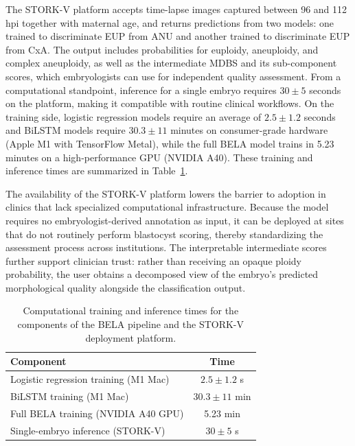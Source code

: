 \documentclass[11pt]{article}
\begin{document}
The STORK-V platform accepts time-lapse images captured between 96 and 112 hpi together with maternal age, and returns predictions from two models: one trained to discriminate EUP from ANU and another trained to discriminate EUP from CxA. The output includes probabilities for euploidy, aneuploidy, and complex aneuploidy, as well as the intermediate MDBS and its sub-component scores, which embryologists can use for independent quality assessment. From a computational standpoint, inference for a single embryo requires $30 \pm 5$ seconds on the platform, making it compatible with routine clinical workflows. On the training side, logistic regression models require an average of $2.5 \pm 1.2$ seconds and BiLSTM models require $30.3 \pm 11$ minutes on consumer-grade hardware (Apple M1 with TensorFlow Metal), while the full BELA model trains in 5.23 minutes on a high-performance GPU (NVIDIA A40). These training and inference times are summarized in Table~\ref{tab:timing}.

The availability of the STORK-V platform lowers the barrier to adoption in clinics that lack specialized computational infrastructure. Because the model requires no embryologist-derived annotation as input, it can be deployed at sites that do not routinely perform blastocyst scoring, thereby standardizing the assessment process across institutions. The interpretable intermediate scores further support clinician trust: rather than receiving an opaque ploidy probability, the user obtains a decomposed view of the embryo's predicted morphological quality alongside the classification output.

\begin{table}[htbp]
\centering
\caption{Computational training and inference times for the components of the BELA pipeline and the STORK-V deployment platform.}
\label{tab:timing}
\begin{tabular}{lc}
\toprule
Component & Time \\
\midrule
Logistic regression training (M1 Mac) & $2.5 \pm 1.2$ s \\
BiLSTM training (M1 Mac) & $30.3 \pm 11$ min \\
Full BELA training (NVIDIA A40 GPU) & 5.23 min \\
Single-embryo inference (STORK-V) & $30 \pm 5$ s \\
\bottomrule
\end{tabular}
\end{table}


\end{document}
